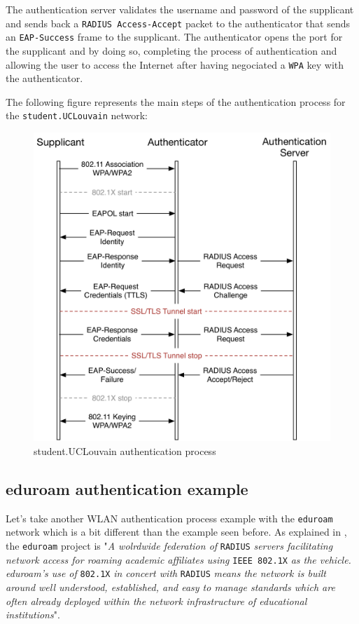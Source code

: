 The authentication server validates the username and password of the supplicant and sends back a \texttt{RADIUS Access-Accept} packet to the authenticator that sends an \texttt{EAP-Success} frame to the supplicant. The authenticator opens the port for the supplicant and by doing so, completing the process of authentication and allowing the user to access the Internet after having negociated a \texttt{WPA} key with the authenticator.

The following figure represents the main steps of the authentication process for the \texttt{student.UCLouvain} network:

\begin{figure}[H]
	\includegraphics[width=.9\linewidth]{Pictures/Chapter2/student.png}
	\caption{student.UCLouvain authentication process}
\end{figure}


\subsection{eduroam authentication example}
Let's take another WLAN authentication process example with the \texttt{eduroam} network which is a bit different than the example seen before.
As explained in \cite{eduroamRadius}, the \texttt{eduroam} project is "\textit{A wolrdwide federation of} \texttt{RADIUS} \textit{ servers facilitating network access for roaming academic affiliates using} \texttt{IEEE 802.1X} \textit{as the vehicle. eduroam's use of} \texttt{802.1X} \textit{in concert with} \texttt{RADIUS} \textit{means the network is built around well understood, established, and easy to manage standards which are often already deployed within the network infrastructure of educational institutions}".

